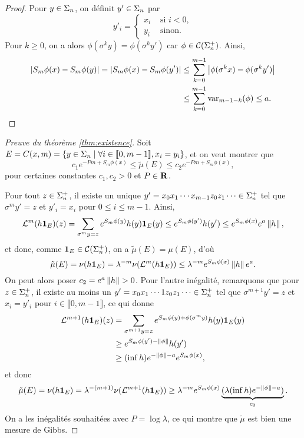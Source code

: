   \begin{proof}
    Pour $y \in \s_n$, on définit $y' \in \s_n$ par
    $$y'_i = \left\{\begin{array}{ll}
	x_i &\text{ si } i < 0, \\
	y_i &\text{ sinon.}
    \end{array}\right.$$
    Pour $k \geq 0$, on a alors $\phi(\sigma^ky) = \phi(\sigma^ky')$ car $\phi \in \Csp{n}$. Ainsi,
    \begin{align*}
      \left|S_m\phi(x) - S_m\phi(y)\right| = \left|S_m\phi(x) - S_m\phi(y')\right| &\leq \sum_{k=0}^{m-1}{\left|\phi(\sigma^kx) - \phi(\sigma^ky')\right|} \\
										   &\leq \sum_{k=0}^{m-1}{\var_{m-1-k}(\phi)} \leq a.
    \end{align*}
  \end{proof}

  \begin{proof}[Preuve du théorème \ref{thm:existence}]
    Soit $E = C(x,m) = \left\{y \in \s_n \mid \forall i \in \llbracket 0, m - 1\rrbracket, x_i = y_i\right\}$, et on veut montrer que
    $$c_1 e^{-Pm+S_m\phi(x)} \leq \tilde\mu(E) \leq c_2 e^{-Pm + S_m\phi(x)},$$
    pour certaines constantes $c_1, c_2 > 0$ et $P \in \R$.

    Pour tout $z \in \sp_n$, il existe un unique $y' = x_0x_1\cdots x_{m-1}z_0z_1\cdots \in \sp_n$ tel que $\sigma^my' = z$
    et $y'_i = x_i$ pour $0 \leq i \leq m - 1$. Ainsi,
    $$\L^m(h\ind{E})(z) = \sum_{\sigma^m y = z}{e^{S_m\phi(y)}h(y)\ind{E}(y)} \leq e^{S_m\phi(y')}h(y') \leq e^{S_m\phi(x)}e^a \No{h},$$
    et donc, comme $\ind{E} \in \Csp{n}$, on a $\tilde\mu(E) = \mu(E)$, d'où
    $$\tilde\mu(E) = \nu(h\ind{E}) = \lambda^{-m}\nu(\L^m(h\ind{E})) \leq \lambda^{-m}e^{S_m\phi(x)}\No{h}e^a.$$
    On peut alors poser $c_2 = e^a\No{h} > 0$.
    Pour l'autre inégalité, remarquons que pour $z \in \sp_n$, il existe au moins un $y' = x_0x_1\cdots 1 z_0z_1\cdots \in \sp_n$ tel que
    $\sigma^{m+1}y' = z$ et $x_i = y'_i$ pour $i \in \llbracket 0, m-1\rrbracket$, ce qui donne
    \begin{align*}
      \L^{m+1}(h\ind{E})(z) &= \sum_{\sigma^{m+1}y=z}{e^{S_m\phi(y) + \phi(\sigma^m y)}h(y)\ind{E}(y)} \\
			    &\geq e^{S_m\phi(y') - \No{\phi}}h(y') \\
			    &\geq (\inf h)e^{-\No{\phi} - a}e^{S_m\phi(x)},
    \end{align*}
    et donc
    $$\tilde\mu(E) = \nu(h\ind{E}) = \lambda^{-(m+1)}\nu(\L^{m+1}(h\ind{E}))
    \geq \lambda^{-m}e^{S_m\phi(x)}\underbrace{(\lambda(\inf h)e^{-\No{\phi}-a})}_{c_2}.$$
    On a les inégalités souhaitées avec $P = \log{\lambda}$, ce qui montre que $\tilde\mu$ est bien une mesure de Gibbs.
  \end{proof}

